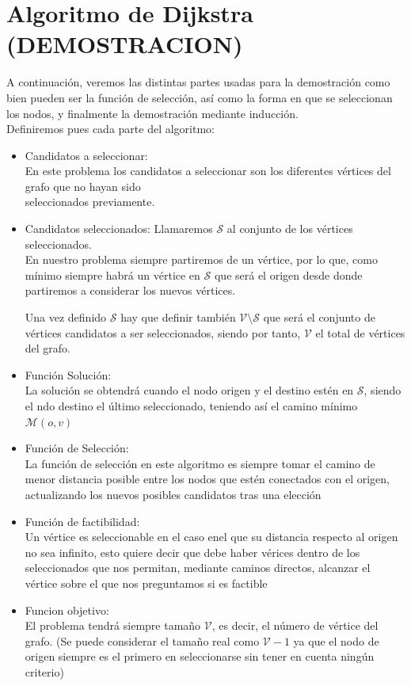 \documentclass[11pt,openany]{book}
\begin{document}
\section{Algoritmo de Dijkstra (DEMOSTRACION)}
A continuación, veremos las distintas partes usadas para la demostración como bien pueden ser la función de selección, así como
la forma en que se seleccionan los nodos, y finalmente la demostración mediante inducción. \\
Definiremos pues cada parte del algoritmo: \\
\begin{itemize}
      \item Candidatos a seleccionar:\\
            En este problema los candidatos a seleccionar son los diferentes vértices del grafo que no hayan sido \\
            seleccionados previamente.
      \item Candidatos seleccionados:
            Llamaremos $\mathscr{S}$ al conjunto de los vértices seleccionados. \\
            En nuestro problema siempre partiremos de un vértice, por lo que, como mínimo siempre habrá un vértice en $\mathscr{S}$ que será el origen 
            desde donde partiremos a considerar los nuevos vértices.

            Una vez definido $\mathscr{S}$ hay que definir también $\mathscr{V}\setminus\mathscr{S}$ que será el conjunto de vértices candidatos a ser seleccionados,
            siendo por tanto, $\mathscr{V}$ el total de vértices del grafo.

      \item Función Solución:\\
            La solución se obtendrá cuando el nodo origen y el destino estén en $\mathscr{S}$, siendo el ndo destino el último seleccionado, teniendo así el camino mínimo $\mathscr{M}(o,v)$

      \item Función de Selección:\\ 
            La función de selección en este algoritmo es siempre tomar el camino de menor distancia posible entre los nodos que estén conectados con el origen, actualizando los nuevos posibles candidatos 
            tras una elección

      \item Función de factibilidad:\\
            Un vértice es seleccionable en el caso enel que su distancia respecto al origen no sea infinito, esto quiere decir que debe haber vérices dentro de los seleccionados que nos permitan, mediante
            caminos directos, alcanzar el vértice sobre el que nos preguntamos si es factible

      \item Funcion objetivo: \\
            El problema tendrá siempre tamaño $\mathscr{V}$, es decir, el número de vértice del grafo. (Se puede considerar el tamaño real como $\mathscr{V}-1$ ya que el nodo de origen siempre es el primero en seleccionarse sin
            tener en cuenta ningún criterio)
\end{itemize}
\end{document}
